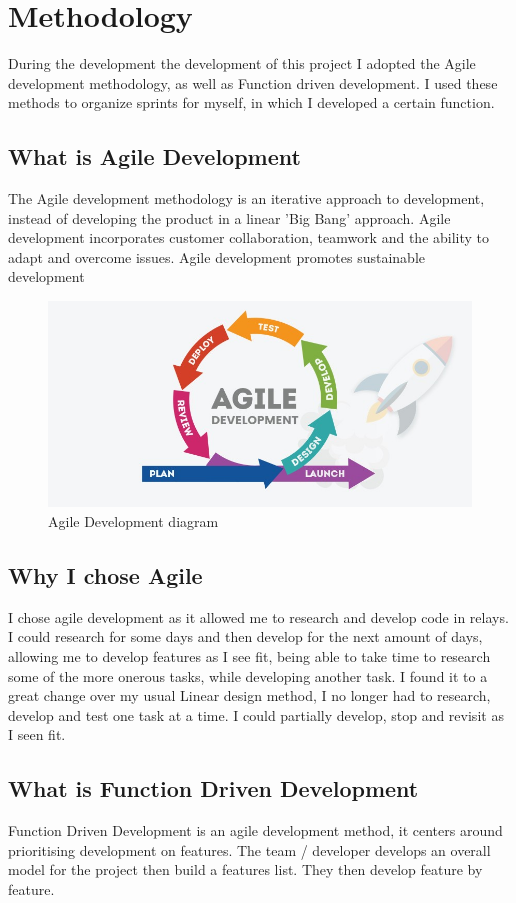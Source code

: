\chapter{Methodology}
During the development the development of this project I adopted the Agile development methodology, as well as Function driven development. I used these methods to organize sprints for myself, in which I developed a certain function.
\section{What is Agile Development}
The Agile development methodology is an iterative approach to development, instead of developing the product in a linear 'Big Bang' approach. Agile development incorporates customer collaboration, teamwork and the ability to adapt and overcome issues. Agile development promotes sustainable development~\cite{agileManifest}
 \begin{figure}[!htbp] 
     \centering
     \includegraphics[scale=0.5]{img/agile.jpg}
     \caption{Agile Development diagram}
     \label{fig:my_label}
 \end{figure} 
\section{Why I chose Agile}
I chose agile development as it allowed me to research and develop code in relays. I could research for some days and then develop for the next amount of days, allowing me to develop features as I see fit, being able to take time to research some of the more onerous tasks, while developing another task. I found it to a great change over my usual Linear design method, I no longer had to research, develop and test one task at a time. I could partially develop, stop and revisit as I seen fit.
\section{What is Function Driven Development}
Function Driven Development is an agile development method, it centers around prioritising development on features. The team / developer develops an overall model for the project then build a features list. They then develop feature by feature.
